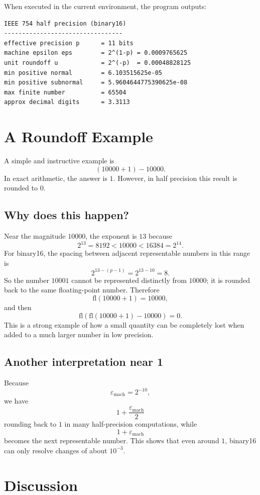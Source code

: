 \documentclass[12pt,a4paper]{article}
\begin{document}
When executed in the current environment, the program outputs:
\begin{verbatim}
IEEE 754 half precision (binary16)
---------------------------------
effective precision p      = 11 bits
machine epsilon eps        = 2^(1-p) = 0.0009765625
unit roundoff u            = 2^(-p)  = 0.00048828125
min positive normal        = 6.103515625e-05
min positive subnormal     = 5.9604644775390625e-08
max finite number          = 65504
approx decimal digits      = 3.3113
\end{verbatim}

\section{A Roundoff Example}

A simple and instructive example is
\[
    (10000+1)-10000.
\]
In exact arithmetic, the answer is $1$. However, in half precision this result is rounded to $0$.

\subsection{Why does this happen?}
Near the magnitude $10000$, the exponent is $13$ because
\[
    2^{13}=8192 < 10000 < 16384 = 2^{14}.
\]
For binary16, the spacing between adjacent representable numbers in this range is
\[
    2^{13-(p-1)} = 2^{13-10} = 8.
\]
So the number $10001$ cannot be represented distinctly from $10000$; it is rounded back to the same floating-point number. Therefore
\[
    \mathrm{fl}(10000+1)=10000,
\]
and then
\[
    \mathrm{fl}(\mathrm{fl}(10000+1)-10000)=0.
\]
This is a strong example of how a small quantity can be completely lost when added to a much larger number in low precision.

\subsection{Another interpretation near 1}
Because
\[
    \varepsilon_{\mathrm{mach}} = 2^{-10},
\]
we have
\[
    1+\frac{\varepsilon_{\mathrm{mach}}}{2}
\]
rounding back to $1$ in many half-precision computations, while
\[
    1+\varepsilon_{\mathrm{mach}}
\]
becomes the next representable number. This shows that even around $1$, binary16 can only resolve changes of about $10^{-3}$.

\section{Discussion}
\end{document}
